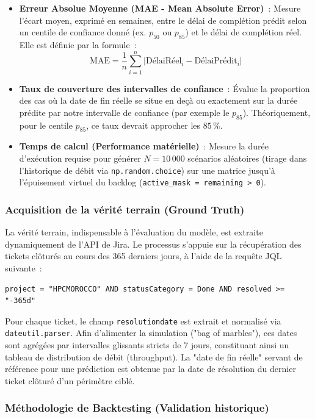 \begin{itemize}
    \renewcommand{\labelitemi}{—}
    \item \textbf{Erreur Absolue Moyenne (MAE - Mean Absolute Error)}~: Mesure l'écart moyen, exprimé en semaines, entre le délai de complétion prédit selon un centile de confiance donné (ex. $p_{50}$ ou $p_{85}$) et le délai de complétion réel. Elle est définie par la formule~:
    \[ \text{MAE} = \frac{1}{n} \sum_{i=1}^{n} \left| \text{DélaiRéel}_i - \text{DélaiPrédit}_i \right| \]
    \item \textbf{Taux de couverture des intervalles de confiance}~: Évalue la proportion des cas où la date de fin réelle se situe en deçà ou exactement sur la durée prédite par notre intervalle de confiance (par exemple le $p_{85}$). Théoriquement, pour le centile $p_{85}$, ce taux devrait approcher les $85\,\%$.
    \item \textbf{Temps de calcul (Performance matérielle)}~: Mesure la durée d'exécution requise pour générer $N = 10\,000$ scénarios aléatoires (tirage dans l'historique de débit via \texttt{np.random.choice}) sur une matrice jusqu'à l'épuisement virtuel du backlog (\texttt{active\_mask = remaining > 0}).
\end{itemize}

\subsubsection{Acquisition de la vérité terrain (Ground Truth)}

La vérité terrain, indispensable à l'évaluation du modèle, est extraite dynamiquement de l'API de Jira. Le processus s'appuie sur la récupération des tickets clôturés au cours des 365 derniers jours, à l'aide de la requête JQL suivante~:
\begin{verbatim}
project = "HPCMOROCCO" AND statusCategory = Done AND resolved >= "-365d"
\end{verbatim}

Pour chaque ticket, le champ \texttt{resolutiondate} est extrait et normalisé via \texttt{dateutil.parser}. Afin d'alimenter la simulation ("bag of marbles"), ces dates sont agrégées par intervalles glissants stricts de 7 jours, constituant ainsi un tableau de distribution de débit (throughput). La "date de fin réelle" servant de référence pour une prédiction est obtenue par la date de résolution du dernier ticket clôturé d'un périmètre ciblé.

\subsubsection{Méthodologie de Backtesting (Validation historique)}

